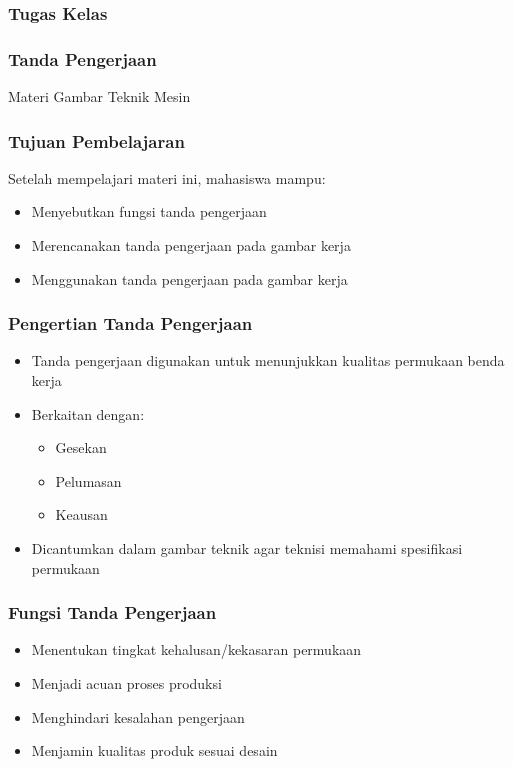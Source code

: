 \documentclass[../gbr_teknik.tex]{subfiles}
\begin{document}
\begin{frame}[mytitle=center,c,mybg=bglight3,light]
	\frametitle{Tugas Kelas}
\end{frame}

\begin{frame}[mytitle=standard,c,mybg=bglight2,light]
	\frametitle{Tanda Pengerjaan}
	\begin{center}
		\Large Materi Gambar Teknik Mesin
	\end{center}\end{frame}

\begin{frame}[mytitle=standard,t,mybg=bglight3,light]
	\frametitle{Tujuan Pembelajaran}
	Setelah mempelajari materi ini, mahasiswa mampu:
	\begin{itemize}
		\item Menyebutkan fungsi tanda pengerjaan
		\item Merencanakan tanda pengerjaan pada gambar kerja
		\item Menggunakan tanda pengerjaan pada gambar kerja
	\end{itemize}
\end{frame}

\begin{frame}[mytitle=standard,t,mycolor=digiPH_uniblue,light]
	\frametitle{Pengertian Tanda Pengerjaan}
	\begin{itemize}
		\item Tanda pengerjaan digunakan untuk menunjukkan kualitas permukaan benda kerja
		\item Berkaitan dengan:
		      \begin{itemize}
			      \item Gesekan
			      \item Pelumasan
			      \item Keausan
		      \end{itemize}
		\item Dicantumkan dalam gambar teknik agar teknisi memahami spesifikasi permukaan
	\end{itemize}
\end{frame}

\begin{frame}[mytitle=standard,t,mycolor=digiPH_white,light]
	\frametitle{Fungsi Tanda Pengerjaan}
	\begin{itemize}
		\item Menentukan tingkat kehalusan/kekasaran permukaan
		\item Menjadi acuan proses produksi
		\item Menghindari kesalahan pengerjaan
		\item Menjamin kualitas produk sesuai desain
	\end{itemize}
\end{frame}
\end{document}
